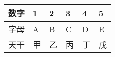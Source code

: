 \begin{tabularx}{\textwidth}{|c|X|X|X|X|X|}
\hline
  数字 & 1 & 2 & 3 & 4 & 5 \\ \hline
  字母 & A & B & C & D & E \\ \hline
  天干 & 甲 & 乙 & 丙 & 丁 & 戊 \\
\hline
\end{tabularx}
